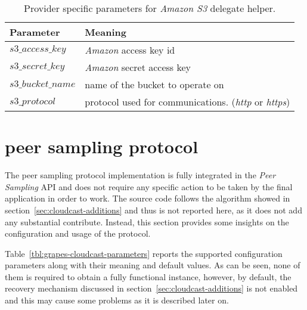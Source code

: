 \begin{table}[H]
  \centering
  \begin{tabular}{|l|l|}
  \hline
  Parameter & Meaning \\
  \hline
  \hline
  $s3\_access\_key$ & \textit{Amazon} access key id \\
  $s3\_secret\_key$ & \textit{Amazon} secret access key \\
  $s3\_bucket\_name$ & name of the bucket to operate on \\
  $s3\_protocol$ & protocol used for communications. (\emph{http}  or
  \emph{https}) \\
  \hline
  \end{tabular}
  \caption{Provider specific parameters for \textit{Amazon S3} delegate helper.}
  \label{tbl:grapes-cloudhelper-libs3}
\end{table}

\section{\cloudcast peer sampling protocol}
The \cloudcast peer sampling protocol implementation is fully
integrated in the \grapes \textit{Peer Sampling} API and does not
require any specific action to be taken by the final application in
order to work. The source code follows the algorithm showed in
section~\ref{sec:cloudcast-additions} and thus is not reported
here, as it does not add any substantial contribute. Instead, this
section provides some insights on the configuration and usage of the
protocol.

Table~\ref{tbl:grapes-cloudcast-parameters} reports the supported
configuration parameters along with their meaning and default
values. As can be seen, none of them is required to obtain a fully
functional instance, however, by default, the recovery mechanism
discussed in section~\ref{sec:cloudcast-additions} is not enabled
and this may cause some problems as it is described later on.

